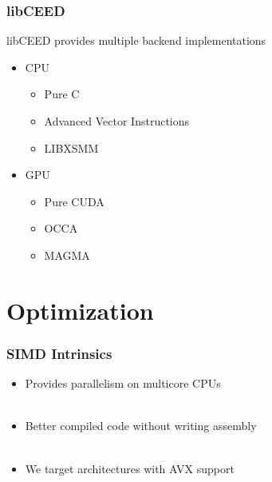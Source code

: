 \documentclass{beamer}
\begin{document}

\begin{frame}
\begin{center}
\frametitle{libCEED}

libCEED provides multiple backend implementations

\begin{itemize}

\item CPU

\begin{itemize}

\item Pure C

\item Advanced Vector Instructions

\item LIBXSMM

\end{itemize}

\item GPU

\begin{itemize}

\item Pure CUDA

\item OCCA

\item MAGMA

\end{itemize}

\end{itemize}

\end{center}
\end{frame}

\section{Optimization}

\begin{frame}
\begin{center}
\frametitle{SIMD Intrinsics}

\begin{itemize}

\item Provides parallelism on multicore CPUs\\

~\\

\item Better compiled code without writing assembly\\

~\\

\item We target architectures with AVX support

\end{itemize}

\end{center}
\end{frame}
\end{document}
